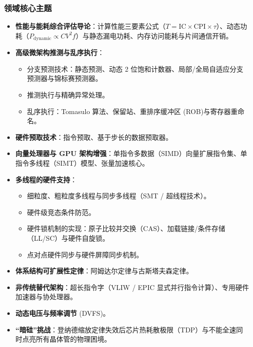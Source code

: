 \subsubsection{领域核心主题}
\begin{itemize}
    \item \textbf{性能与能耗综合评估导论}：计算性能三要素公式（$T = \text{IC} \times \text{CPI} \times \tau$）、动态功耗（$P_{\text{dynamic}} \propto C V^2 f$）与静态漏电功耗、内存访问能耗与片间通信开销。
    \item \textbf{高级微架构推测与乱序执行}：
    \begin{itemize}
        \item 分支预测技术：静态预测、动态 2 位饱和计数器、局部/全局自适应分支预测器与锦标赛预测器。
        \item 推测执行与精确异常处理。
        \item 乱序执行：Tomasulo 算法、保留站、重排序缓冲区 (ROB)与寄存器重命名。
    \end{itemize}
    \item \textbf{硬件预取技术}：指令预取、基于步长的数据预取器。
    \item \textbf{向量处理器与 GPU 架构增强}：单指令多数据（SIMD）向量扩展指令集、单指令多线程（SIMT）模型、张量加速核心。
    \item \textbf{多线程的硬件支持}：
    \begin{itemize}
        \item 细粒度、粗粒度多线程与同步多线程（SMT / 超线程技术）。
        \item 硬件级竞态条件防范。
        \item 硬件锁机制的实现：原子比较并交换（CAS）、加载链接/条件存储（LL/SC）与硬件自旋锁。
        \item 点对点硬件同步与硬件屏障同步机制。
    \end{itemize}
    \item \textbf{体系结构可扩展性定律}：阿姆达尔定律与古斯塔夫森定律。
    \item \textbf{非传统替代架构}：超长指令字（VLIW / EPIC 显式并行指令计算）、专用硬件加速器与协处理器。
    \item \textbf{动态电压与频率调节} (DVFS)。
    \item \textbf{“暗硅”挑战}：登纳德缩放定律失效后芯片热耗散极限（TDP）与不能全速同时点亮所有晶体管的物理困境。
\end{itemize}

